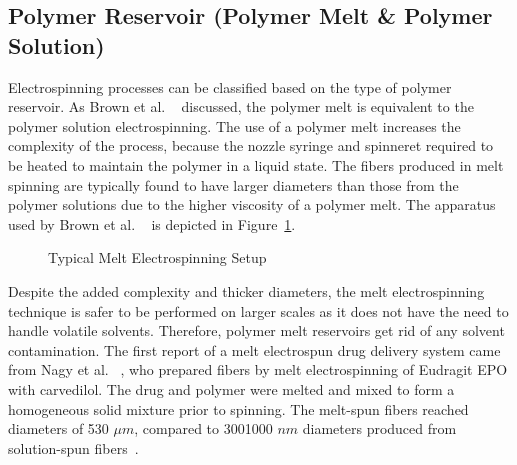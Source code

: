 \subsection{Polymer Reservoir (Polymer Melt \& Polymer Solution)}Electrospinning processes can be classified based on the type of polymer reservoir. As Brown et al. \unskip~\cite{527120:13445499} discussed, the polymer melt is equivalent to the polymer solution electrospinning. The use of a polymer melt increases the complexity of the process, because the nozzle syringe and spinneret required to be heated to maintain the polymer in a liquid state. The fibers produced in melt spinning are typically found to have larger diameters than those from the polymer solutions due to the higher viscosity of a polymer melt. The apparatus used by Brown et al. \unskip~\cite{527120:13445499} is depicted in Figure~\ref{f-bfd139aecf8f}.


\bgroup
\begin{figure}[!htbp]
\centering \makeatletter{}
\makeatother 
\caption{{Typical Melt Electrospinning Setup}}
\label{f-bfd139aecf8f}
\end{figure}
\egroup
Despite the added complexity and thicker diameters, the melt electrospinning technique is safer to be performed on larger scales as it does not have the need to handle volatile solvents. Therefore, polymer melt reservoirs get rid of any solvent contamination. The first report of a melt electrospun drug delivery system came from Nagy et al. \unskip~\cite{527120:13445555}, who prepared fibers by melt electrospinning of Eudragit EPO with carvedilol. The drug and polymer were melted and mixed to form a homogeneous solid mixture prior to spinning. The melt-spun fibers reached diameters of 5{\textendash}30 $\mu m $, compared to 300{\textendash}1000 $nm $ diameters produced from solution-spun fibers\unskip~\cite{527120:13445555}.

